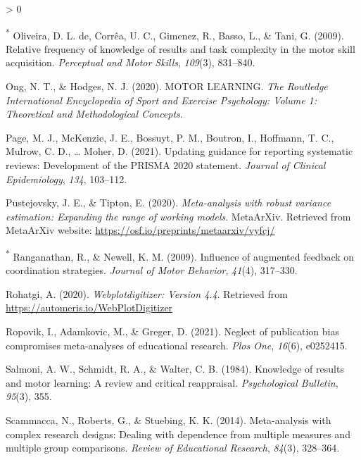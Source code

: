 \documentclass[
  english,
  man, donotrepeattitle,mask,floatsintext]{apa7}
\newlength{\cslhangindent}
\newenvironment{CSLReferences}[2] %
 {%
  \setlength{\parindent}{0pt}
  \ifodd #1 \everypar{\setlength{\hangindent}{\cslhangindent}}\ignorespaces\fi
  \ifnum #2 > 0
  \setlength{\parskip}{#2\baselineskip}
  \fi
 }%
 {}
\begin{document}
\begin{CSLReferences}{1}{0}
\leavevmode\hypertarget{ref-Oliveira2009}{}%
\textsuperscript{*} Oliveira, D. L. de, Corrêa, U. C., Gimenez, R., Basso, L., \& Tani, G. (2009). Relative frequency of knowledge of results and task complexity in the motor skill acquisition. \emph{Perceptual and Motor Skills}, \emph{109}(3), 831--840.

\leavevmode\hypertarget{ref-Ong2020}{}%
Ong, N. T., \& Hodges, N. J. (2020). MOTOR LEARNING. \emph{The Routledge International Encyclopedia of Sport and Exercise Psychology: Volume 1: Theoretical and Methodological Concepts}.

\leavevmode\hypertarget{ref-Page2021}{}%
Page, M. J., McKenzie, J. E., Bossuyt, P. M., Boutron, I., Hoffmann, T. C., Mulrow, C. D., \ldots{} Moher, D. (2021). Updating guidance for reporting systematic reviews: Development of the PRISMA 2020 statement. \emph{Journal of Clinical Epidemiology}, \emph{134}, 103--112.

\leavevmode\hypertarget{ref-Pustejovsky2020}{}%
Pustejovsky, J. E., \& Tipton, E. (2020). \emph{Meta-analysis with robust variance estimation: Expanding the range of working models}. MetaArXiv. Retrieved from MetaArXiv website: \url{https://osf.io/preprints/metaarxiv/vyfcj/}

\leavevmode\hypertarget{ref-Ranganathan2009}{}%
\textsuperscript{*} Ranganathan, R., \& Newell, K. M. (2009). Influence of augmented feedback on coordination strategies. \emph{Journal of Motor Behavior}, \emph{41}(4), 317--330.

\leavevmode\hypertarget{ref-Rohatgi2020}{}%
Rohatgi, A. (2020). \emph{Webplotdigitizer: Version 4.4}. Retrieved from \url{https://automeris.io/WebPlotDigitizer}

\leavevmode\hypertarget{ref-Ropovik2021}{}%
Ropovik, I., Adamkovic, M., \& Greger, D. (2021). Neglect of publication bias compromises meta-analyses of educational research. \emph{Plos One}, \emph{16}(6), e0252415.

\leavevmode\hypertarget{ref-Salmoni1984}{}%
Salmoni, A. W., Schmidt, R. A., \& Walter, C. B. (1984). Knowledge of results and motor learning: A review and critical reappraisal. \emph{Psychological Bulletin}, \emph{95}(3), 355.

\leavevmode\hypertarget{ref-Scammacca2014}{}%
Scammacca, N., Roberts, G., \& Stuebing, K. K. (2014). Meta-analysis with complex research designs: Dealing with dependence from multiple measures and multiple group comparisons. \emph{Review of Educational Research}, \emph{84}(3), 328--364.


\end{CSLReferences}
\end{document}

